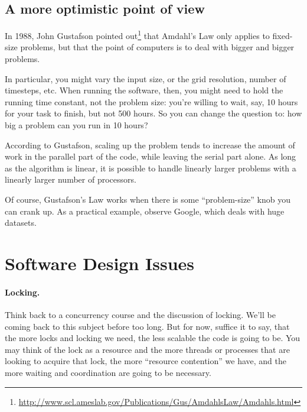 \documentclass[a4paper]{report}
\begin{document}



\subsection*{A more optimistic point of view}
In 1988, John Gustafson pointed
out\footnote{\url{http://www.scl.ameslab.gov/Publications/Gus/AmdahlsLaw/Amdahls.html}}
that Amdahl's Law only applies to fixed-size problems, but that the
point of computers is to deal with bigger and bigger problems.

In particular, you might vary the input size, or the grid resolution,
number of timesteps, etc. When running the software, then, you might
need to hold the running time constant, not the problem size: you're
willing to wait, say, 10 hours for your task to finish, but not 500
hours. So you can change the question to: how big a problem can you
run in 10 hours?

According to Gustafson, scaling up the problem tends to increase the
amount of work in the parallel part of the code, while leaving the
serial part alone. As long as the algorithm is linear, it is possible
to handle linearly larger problems with a linearly larger number of
processors.

Of course, Gustafson's Law works when there is some ``problem-size''
knob you can crank up.  As a practical example, observe Google, which
deals with huge datasets.


\section*{Software Design Issues}


\paragraph{Locking.}
Think back to a concurrency course and the discussion of locking. We'll be coming back to this subject before too long. But for now, suffice it to say, that the more locks and locking we need, the less scalable the code is going to be. You may think of the lock as a resource and the more threads or processes that are looking to acquire that lock, the more ``resource contention'' we have, and the more waiting and coordination are going to be necessary.
\end{document}
